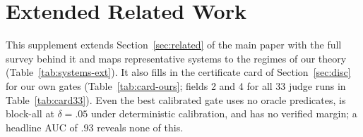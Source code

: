 \section{Extended Related Work}\label{app:related}

This supplement extends Section~\ref{sec:related} of the main paper with the full survey
behind it and maps representative systems to the regimes of our theory
(Table~\ref{tab:systems-ext}). It also fills in the certificate card of Section~\ref{sec:disc}
for our own gates (Table~\ref{tab:card-ours}; fields 2 and 4 for all 33 judge runs in
Table~\ref{tab:card33}). Even the best calibrated gate uses no oracle predicates, is block-all
at $\delta=.05$ under deterministic calibration, and has no verified margin; a headline AUC of
$.93$ reveals none of this.

